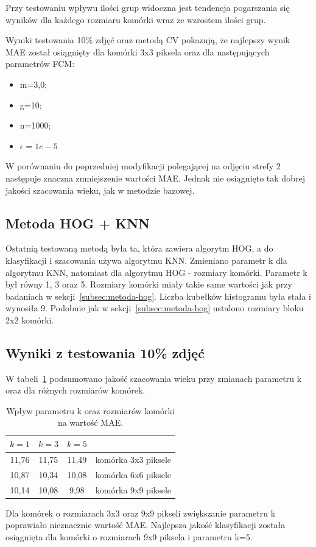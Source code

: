 \documentclass[a4paper,twoside,12pt]{book}
\begin{document}
    Przy testowaniu wpływu ilości grup widoczna jest tendencja pogarszania się wyników dla każdego rozmiaru komórki
    wraz ze wzrostem ilości grup.

    Wyniki testowania 10\% zdjęć oraz metodą CV pokazują, że najlepszy wynik MAE został osiągnięty dla komórki 3x3
    piksela oraz dla następujących parametrów FCM:
    \begin{itemize}
        \item m=3,0;
        \item g=10;
        \item n=1000;
        \item $\epsilon=1e-5$
    \end{itemize}

    W porównaniu do poprzedniej modyfikacji polegającej na odjęciu strefy 2 następuje znaczna zmniejszenie
    wartości MAE.
    Jednak nie osiągnięto tak dobrej jakości szacowania wieku, jak w metodzie bazowej.

    \subsection{Metoda HOG + KNN}\label{subsec:metoda-hog-+-knn}
    Ostatnią testowaną metodą była ta, która zawiera algorytm HOG, a do klasyfikacji i szacowania używa algorytmu KNN.
    Zmieniano parametr k dla algorytmu KNN, natomiast dla algorytmu HOG - rozmiary komórki.
    Parametr k był równy 1, 3 oraz 5. Rozmiary komórki miały takie same wartości jak przy badaniach w
    sekcji~\ref{subsec:metoda-hog}.
    Liczba kubełków histogramu była stała i wynosiła 9. Podobnie jak w sekcji~\ref{subsec:metoda-hog} ustalono rozmiary
    bloku 2x2 komórki.
    \subsection*{Wyniki z testowania 10\% zdjęć}
    W tabeli~\ref{tab.hogknn} podsumowano jakość szacowania wieku przy zmianach parametru k oraz dla różnych
    rozmiarów komórek.
    \begin{table}[h!]
        \centering
        \caption{Wpływ parametru k oraz rozmiarów komórki na wartość MAE.}
        \begin{tabular}{|c|c|c|c|}
            \hline
            $k=1$ & $k=3$ & $k=5$ &                     \\ \hline
            11,76 & 11,75 & 11,49 & komórka 3x3 piksele \\ \hline
            10,87 & 10,34 & 10,08 & komórka 6x6 piksele \\ \hline
            10,14 & 10,08 & 9,98 & komórka 9x9 piksele \\ \hline
        \end{tabular}
        \label{tab.hogknn}
    \end{table}
    Dla komórek o rozmiarach 3x3 oraz 9x9 pikseli zwiększanie parametru k poprawiało nieznacznie wartość MAE.
    Najlepsza jakość klasyfikacji została osiągnięta dla komórki o rozmiarach 9x9 piksela i parametru k=5.
\end{document}
